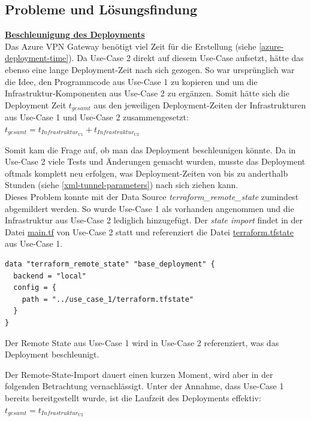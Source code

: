 \subsection{Probleme und Lösungsfindung}

\textbf{\underline{Beschleunigung des \gls{Deployment}s}}\label{accelerate-deployment-use-case-2}\\
Das Azure VPN Gateway benötigt viel Zeit für die Erstellung (siehe \ref{azure-deployment-time}). Da Use-Case 2 direkt auf diesem Use-Case aufsetzt, hätte das ebenso eine lange \gls{Deployment}-Zeit nach sich gezogen. So war ursprünglich war die Idee, den Programmcode aus Use-Case 1 zu kopieren und um die Infrastruktur-Komponenten aus Use-Case 2 zu ergänzen. Somit hätte sich die \gls{Deployment} Zeit $t_{gesamt}$ aus den jeweiligen \gls{Deployment}-Zeiten der Infrastrukturen aus Use-Case 1 und Use-Case 2 zusammengesetzt:\\
$t_{gesamt} = t_{Infrastruktur_{U1}} + t_{Infrastruktur_{U2}}$

Somit kam die Frage auf, ob man das \gls{Deployment} beschleunigen könnte. Da in Use-Case 2 viele Tests und Änderungen gemacht wurden, musste das \gls{Deployment} oftmals komplett neu erfolgen, was \gls{Deployment}-Zeiten von bis zu anderthalb Stunden (siehe \ref{xml-tunnel-parameters}) nach sich ziehen kann.\\
Dieses Problem konnte mit der Data Source \textit{terraform\_remote\_state} zumindest abgemildert werden\cite{remotestateimport2021}. So wurde Use-Case 1 als vorhanden angenommen und die Infrastruktur aus Use-Case 2 lediglich hinzugefügt. Der \textit{state import} findet in der Datei \underline{main.tf} von Use-Case 2 statt und referenziert die Datei \underline{terraform.tfstate} aus Use-Case 1.
\begin{listing}[h]
\begin{verbatim}
data "terraform_remote_state" "base_deployment" {
  backend = "local"
  config = {
    path = "../use_case_1/terraform.tfstate"
  }
}

\end{verbatim}
\caption{Der Remote State aus Use-Case 1 wird in Use-Case 2 referenziert, was das \gls{Deployment} beschleunigt.}
\label{tf-remote-state-import}
\end{listing}\FloatBarrier
Der Remote-State-Import dauert einen kurzen Moment, wird aber in der folgenden Betrachtung vernachlässigt.
Unter der Annahme, dass Use-Case 1 bereits bereitgestellt wurde, ist die Laufzeit des \gls{Deployment}s effektiv:\\
$t_{gesamt} = t_{Infrastruktur_{U2}}$

